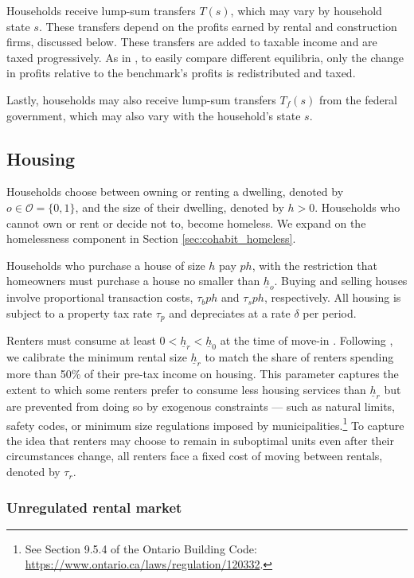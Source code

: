 \documentclass[parskip=full]{article}
\begin{document}
Households receive lump-sum transfers $T(s)$, which may vary by household state $s$. These transfers depend on the profits earned by rental and construction firms, discussed below. These transfers are added to taxable income and are taxed progressively. As in \citet{kkk-2021}, to easily compare different equilibria, only the change in profits relative to the benchmark's profits is redistributed and taxed.

Lastly, households may also receive lump-sum transfers $T_f(s)$ from the federal government, which may also vary with the household’s state $s$.

\subsection{Housing}\label{subsection:housing_choice}

Households choose between owning or renting a dwelling, denoted by $o \in \mathcal{O}=\{0,1\}$, and the size of their dwelling, denoted by $h>0$. Households who cannot own or rent or decide not to, become homeless. We expand on the homelessness component in Section \ref{sec:cohabit_homeless}.

Households who purchase a house of size $h$ pay $p h$, with the restriction that homeowners must purchase a house no smaller than $\underline{h}_{o}$. Buying and selling houses involve proportional transaction costs, $\tau_{b} p h$ and $\tau_{s} p h$, respectively. All housing is subject to a property tax rate $\tau_{p}$ and depreciates at a rate $\delta$ per period. 

Renters must consume at least $0<\underline{h}_{r}<\underline{h}_{0}$ at the time of move-in \citep{gervais,sommeretal-2013,sommersullivan-2017,kaplanetal-2019,rs-2023}. Following \citet{rs-2023}, we calibrate the minimum rental size $\underline{h}_{r}$ to match the share of renters spending more than 50\% of their pre-tax income on housing. This parameter captures the extent to which some renters prefer to consume less housing services than $\underline{h}_{r}$ but are prevented from doing so by exogenous constraints — such as natural limits, safety codes, or minimum size regulations imposed by municipalities.\footnote{See Section 9.5.4 of the Ontario Building Code: \url{https://www.ontario.ca/laws/regulation/120332}.} To capture the idea that renters may choose to remain in suboptimal units even after their circumstances change, all renters face a fixed cost of moving between rentals, denoted by $\tau_r$.

\subsubsection{Unregulated rental market}
\end{document}
